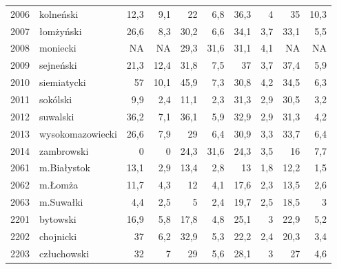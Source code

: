 \begin{center}
\begin{longtable}{lp{3cm}rrrrrrrr}
2006 & kolneński               & 12,3    & 9,1         & 22       & 6,8          & 36,3     & 4            & 35       & 10,3         \\
2007 & łomżyński               & 26,6    & 8,3         & 30,2     & 6,6          & 34,1     & 3,7          & 33,1     & 5,5          \\
2008 & moniecki                & NA      & NA          & 29,3     & 31,6         & 31,1     & 4,1          & NA       & NA           \\
2009 & sejneński               & 21,3    & 12,4        & 31,8     & 7,5          & 37       & 3,7          & 37,4     & 5,9          \\
2010 & siemiatycki             & 57      & 10,1        & 45,9     & 7,3          & 30,8     & 4,2          & 34,5     & 6,3          \\
2011 & sokólski                & 9,9     & 2,4         & 11,1     & 2,3          & 31,3     & 2,9          & 30,5     & 3,2          \\
2012 & suwalski                & 36,2    & 7,1         & 36,1     & 5,9          & 32,9     & 2,9          & 31,3     & 4,2          \\
2013 & wysokomazowiecki        & 26,6    & 7,9         & 29       & 6,4          & 30,9     & 3,3          & 33,7     & 6,4          \\
2014 & zambrowski              & 0       & 0           & 24,3     & 31,6         & 24,3     & 3,5          & 16       & 7,7          \\
2061 & m.Białystok             & 13,1    & 2,9         & 13,4     & 2,8          & 13       & 1,8          & 12,2     & 1,5          \\
2062 & m.Łomża                 & 11,7    & 4,3         & 12       & 4,1          & 17,6     & 2,3          & 13,5     & 2,6          \\
2063 & m.Suwałki               & 4,4     & 2,5         & 5        & 2,4          & 19,7     & 2,5          & 18,5     & 3            \\
2201 & bytowski                & 16,9    & 5,8         & 17,8     & 4,8          & 25,1     & 3            & 22,9     & 5,2          \\
2202 & chojnicki               & 37      & 6,2         & 32,9     & 5,3          & 22,2     & 2,4          & 20,3     & 3,4          \\
2203 & człuchowski             & 32      & 7           & 29       & 5,6          & 28,1     & 3            & 27       & 4,6          \\

\end{longtable}
\end{center}
